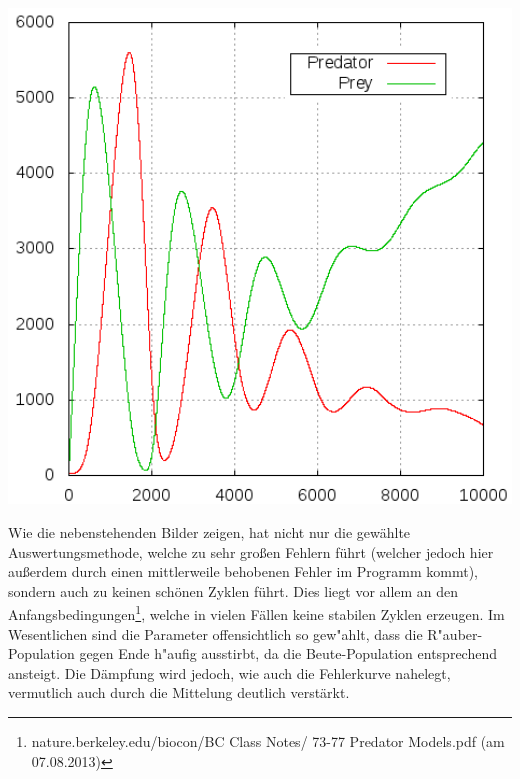 \documentclass[11pt]{article}
\begin{document}
\begin{minipage}[b]{0.58\textwidth}
\includegraphics[width=1.0\textwidth]{Graphiken/ppm45pop.png}
\end{minipage}
\begin{minipage}[b]{0.39\textwidth}
Wie die nebenstehenden Bilder zeigen, hat nicht nur die gewählte Auswertungsmethode, welche zu sehr großen Fehlern führt (welcher jedoch hier außerdem durch einen mittlerweile behobenen Fehler im Programm kommt), sondern auch zu keinen schönen Zyklen führt. Dies liegt vor allem an den Anfangsbedingungen\footnote{nature.berkeley.edu/biocon/BC Class Notes/ 73-77 Predator Models.pdf (am 07.08.2013)}, welche in vielen Fällen keine stabilen Zyklen erzeugen. Im Wesentlichen sind die Parameter offensichtlich so gew"ahlt, dass die R"auber-Population gegen Ende h"aufig ausstirbt, da die Beute-Population entsprechend ansteigt. Die Dämpfung wird jedoch, wie auch die Fehlerkurve nahelegt, vermutlich auch durch die Mittelung deutlich verstärkt.
\end{minipage}
\end{document}
